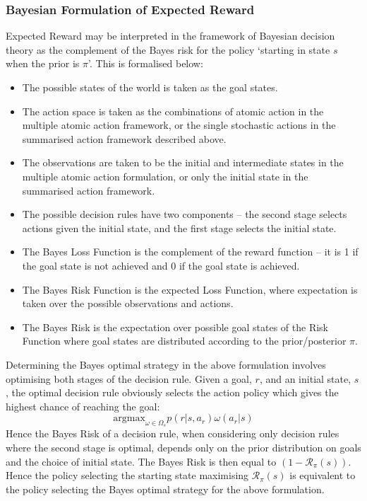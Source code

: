 \documentclass{article}
\begin{document}
\subsubsection{Bayesian Formulation of Expected Reward}
Expected Reward may be interpreted in the framework of Bayesian decision theory as the complement of the Bayes risk for the policy `starting in state $s$ when the prior is $\pi$'. This is formalised below: 
\begin{itemize}
\item The possible states of the world is taken as the goal states.
\item The action space is taken as the combinations of atomic action in the multiple atomic action framework, or the single stochastic actions in the summarised action framework described above.
\item The observations are taken to be the initial and intermediate states in the multiple atomic action formulation, or only the initial state in the summarised action framework.
\item The possible decision rules have two components -- the second stage selects actions given the initial state, and the first stage selects the initial state. 
\item The Bayes Loss Function is the complement of the reward function -- it is 1 if the goal state is not achieved and 0 if the goal state is achieved.
\item The Bayes Risk Function is the expected Loss Function, where expectation is taken over the possible observations and actions. 
\item The Bayes Risk is the expectation over possible goal states of the Risk Function where goal states are distributed according to the prior/posterior $\pi$. 
\end{itemize}
Determining the Bayes optimal strategy in the above formulation involves optimising both stages of the decision rule. Given a goal, $r$, and an initial state, $s$, the optimal decision rule obviously selects the action policy which gives the highest chance of reaching the goal: 
\[\text{argmax}_{\omega\in\Omega_s} p(r|s,a_r)\omega(a_r|s)\]
Hence the Bayes Risk of a decision rule, when considering only decision rules where the second stage is optimal, depends only on the prior distribution on goals and the choice of initial state. The Bayes Risk is then equal to $(1-\mathcal{R}_\pi(s))$. Hence the policy selecting the starting state maximising $\mathcal{R}_\pi(s)$ is equivalent to the policy selecting the Bayes optimal strategy for the above formulation.
\end{document}
